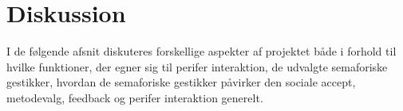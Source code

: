 \chapter{Diskussion}
\label{SamletDiskussion}
%
I de følgende afsnit diskuteres forskellige aspekter af projektet både i forhold til hvilke funktioner, der egner sig til perifer interaktion, de udvalgte semaforiske gestikker, hvordan de semaforiske gestikker påvirker den sociale accept, metodevalg, feedback og perifer interaktion generelt. 



